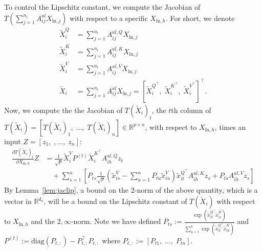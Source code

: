 \documentclass{article}
\begin{document}
To control the Lipschitz constant, we compute the Jacobian of $T(\sum_{j=1}^{n_l} A^{al}_{ij}X_{\text{ln}, j})$ with respect
to a specific $X_{\text{ln}, h}$. For short, we denote 
\begin{align*}
\tilde X_i^Q &= \sum_{j=1}^{n_l} A^{al, Q}_{ij} X_{\text{ln},j}\\
\tilde X_i^K &= \sum_{j=1}^{n_l} A^{al, K}_{ij} X_{\text{ln},j}\\
\tilde X_i^V &= \sum_{j=1}^{n_l} A^{al, V}_{ij} X_{\text{ln},j}\\
\tilde X_i &= \sum_{j=1}^{n_l} A^{al}_{ij} X_{\text{ln},j} = 
[\tilde X_i^{Q^\top},\; \tilde X_i^{K^\top},\; \tilde X_i^{V^\top}]^\top.
\end{align*}
Now, we compute the the Jacobian of $T(\tilde X_i)_t$, 
the $t$th column of $T(\tilde X_i) = [T(\tilde X_i)_1,\; \ldots,\; T(\tilde X_i)_n]\in\mathbb R^{p\times n}$,
with respect to $X_{\text{ln}, h}$, times an input $Z = [z_1,\;,\ldots,\; z_n]$:
\begin{align}
  \frac{\partial T(\tilde X_i)_t}{\partial X_{\text{ln}, h}}Z
  & = \frac1{\sqrt p}\tilde X_i^V P^{(t)} \tilde X_i^{K^\top} A_{ih}^{al, Q} z_t \label{eq:lna} \\
  &\quad + \sum_{s=1}^n [P_{ts}\frac1{\sqrt p} (\tilde x^V_{is} - \sum_{u=1}^n P_{tu} \tilde x^V_{iu}) \tilde x_{it}^{Q^\top}
  A^{al, K}_{ih} z_s + P_{ts} A^{al, V}_{ih} z_s]\nonumber
\end{align}
By Lemma~\ref{lem:jaclip}, a bound on the 2-norm of the above quantity, which is a vector in $\mathbb R^{d_a}$,
will be a bound on the Lipschitz constant 
of $T(\tilde X_i)$ with respect to $X_{\text{ln}, h}$ and the $2,\infty$-norm.
Note we have defined $P_{ts} := \frac{\exp(\tilde x_{it}^{Q^\top} \tilde x_{is}^K)}{
\sum_{u=1}^n \exp(\tilde x_{it}^{Q^\top}\tilde x_{iu}^K)}$ and $P^{(t)} := \mathrm{diag}(P_{t,:}) - P_{t,:}^\top P_{t,:}$ where 
$P_{t,:} := [P_{t1},\;\ldots,\; P_{tn}]$.
\end{document}
